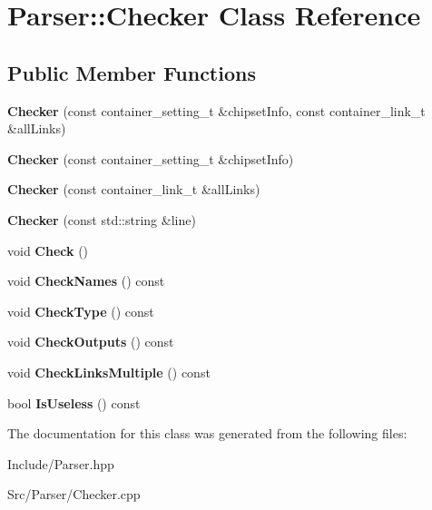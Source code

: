 \hypertarget{classParser_1_1Checker}{}\section{Parser\+:\+:Checker Class Reference}
\label{classParser_1_1Checker}
\subsection*{Public Member Functions}
\begin{DoxyCompactItemize}
\item 
\mbox{\label{classParser_1_1Checker_a57cef62f94c2f4bf0795e4d434dc6069}} 
{\bfseries Checker} (const container\+\_\+setting\+\_\+t \&chipset\+Info, const container\+\_\+link\+\_\+t \&all\+Links)
\item 
\mbox{\label{classParser_1_1Checker_ae925eba41fa833edde25e1ef3dcd04c0}} 
{\bfseries Checker} (const container\+\_\+setting\+\_\+t \&chipset\+Info)
\item 
\mbox{\label{classParser_1_1Checker_a87e0ce608ac90feaca458d66d224b1d2}} 
{\bfseries Checker} (const container\+\_\+link\+\_\+t \&all\+Links)
\item 
\mbox{\label{classParser_1_1Checker_a0aaff69ec0fdaffc339d34062707f839}} 
{\bfseries Checker} (const std\+::string \&line)
\item 
\mbox{\label{classParser_1_1Checker_ad396a3c43a4c4c111052272b71710f35}} 
void {\bfseries Check} ()
\item 
\mbox{\label{classParser_1_1Checker_a342e5fae6d2a36377e3288258e3743a5}} 
void {\bfseries Check\+Names} () const
\item 
\mbox{\label{classParser_1_1Checker_af19c4303b859db1347e24e3dc0f8177a}} 
void {\bfseries Check\+Type} () const
\item 
\mbox{\label{classParser_1_1Checker_a7a9fbde5ddef9a6a679eb26d6cbeee6a}} 
void {\bfseries Check\+Outputs} () const
\item 
\mbox{\label{classParser_1_1Checker_a63948e7c29a6d49a45132a79659d52ac}} 
void {\bfseries Check\+Links\+Multiple} () const
\item 
\mbox{\label{classParser_1_1Checker_aa454723cd447e58073d2a44838aa87df}} 
bool {\bfseries Is\+Useless} () const
\end{DoxyCompactItemize}


The documentation for this class was generated from the following files\+:\begin{DoxyCompactItemize}
\item 
Include/Parser.\+hpp\item 
Src/\+Parser/Checker.\+cpp\end{DoxyCompactItemize}
